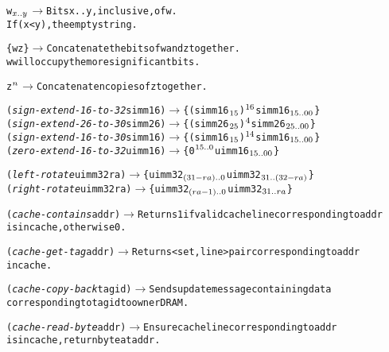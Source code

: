 \codestretch
\begin{alltt}
w\(\sb{x..y}\)                             \(\longrightarrow\)   \textrm{Bits }x..y\textrm{, inclusive, of} w.
                                       \textrm{If (}x < y\textrm{), the empty string.}

\{ w z \}                          \(\longrightarrow\)   \textrm{Concatenate the bits of }w\textrm{ and }z\textrm{ together.}
                                       w\textrm{ will occupy the more significant bits.}

z\(\sp{n}\)                               \(\longrightarrow\)   {\textrm{Concatenate }}n{\textrm{ copies of }}z{\textrm{ together.}}

({\em{sign-extend-16-to-32}} simm16)    \(\longrightarrow\)   \{ (simm16\(\sb{15}\))\(\sp{16}\) simm16\(\sb{15..00}\) \}
({\em{sign-extend-26-to-30}} simm26)    \(\longrightarrow\)   \{ (simm26\(\sb{25}\))\(\sp{4}\)  simm26\(\sb{25..00}\) \}
({\em{sign-extend-16-to-30}} simm16)    \(\longrightarrow\)   \{ (simm16\(\sb{15}\))\(\sp{14}\) simm16\(\sb{15..00}\) \}
({\em{zero-extend-16-to-32}} uimm16)    \(\longrightarrow\)   \{ 0\(\sp{15..0}\) uimm16\(\sb{15..00}\) \}

({\em{left-rotate}}  uimm32 ra)         \(\longrightarrow\)   \{ uimm32\(\sb{(31-ra)..0}\) uimm32\(\sb{31..(32-ra)}\)  \}
({\em{right-rotate}} uimm32 ra)         \(\longrightarrow\)   \{ uimm32\(\sb{(ra-1)..0}\)  uimm32\(\sb{31..ra}\)     \}

({\em{cache-contains}} addr)            \(\longrightarrow\)   \textrm{Returns 1 if valid cache line corresponding to} addr
                             \hspace{.25mm}          \textrm{is in cache, otherwise 0}.

({\em{cache-get-tag}} addr)             \(\longrightarrow\)   \textrm{Returns} <set,line> \textrm{pair corresponding to} addr
                             \hspace{.25mm}          \textrm{in cache.}

({\em{cache-copy-back}} tagid)             \(\longrightarrow\)   \textrm{Sends update message containing data}
                             \hspace{.25mm}          \textrm{corresponding to} tagid \textrm{to owner DRAM.}

({\em{cache-read-byte}} addr)           \(\longrightarrow\)   \textrm{Ensure cache line corresponding to} addr
                             \hspace{.25mm}          \textrm{is in cache, return byte at} addr.


\end{alltt}

